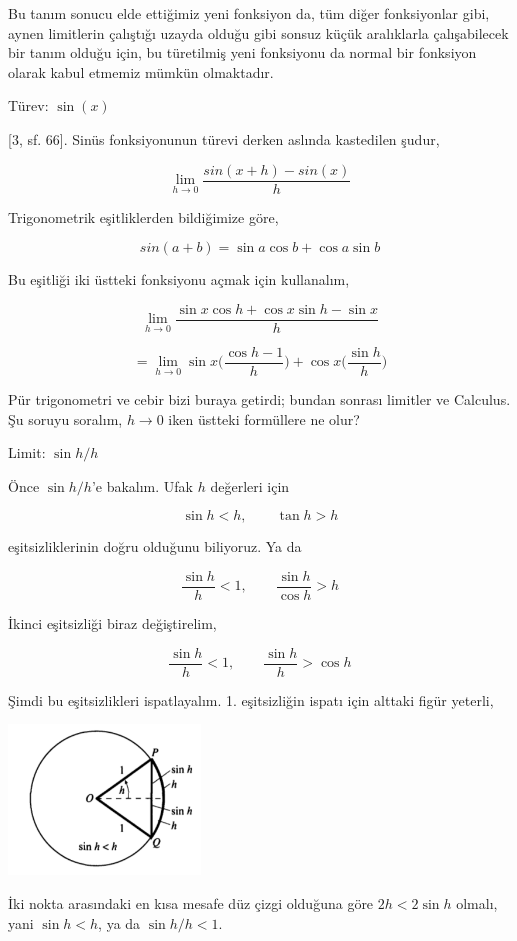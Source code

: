 \documentclass[12pt,fleqn]{article}\usepackage{../../common}
\begin{document}
Bu tanım sonucu elde ettiğimiz yeni fonksiyon da, tüm diğer fonksiyonlar
gibi, aynen limitlerin çalıştığı uzayda olduğu gibi sonsuz küçük
aralıklarla çalışabilecek bir tanım olduğu için, bu türetilmiş yeni
fonksiyonu da normal bir fonksiyon olarak kabul etmemiz mümkün olmaktadır.

Türev: $\sin(x)$

[3, sf. 66]. Sinüs fonksiyonunun türevi derken aslında kastedilen şudur,

$$ \lim_{h \to 0} \frac{sin(x+h) - sin(x)}{h} $$

Trigonometrik eşitliklerden bildiğimize göre, 

$$ sin(a+b) = \sin a \cos b + \cos a \sin b $$

Bu eşitliği iki üstteki fonksiyonu açmak için kullanalım,

$$ \lim_{h \to 0} \frac{\sin x \cos h + \cos x \sin h - \sin x }{h} $$

$$ = \lim_{h \to 0} \sin x \bigg( \frac{\cos h - 1}{h} \bigg) + \cos x \bigg( \frac{\sin h}{h} \bigg) $$

Pür trigonometri ve cebir bizi buraya getirdi; bundan sonrası limitler ve
Calculus. Şu soruyu soralım, $h \to 0$ iken üstteki formüllere ne olur? 

Limit: $\sin h / h$

Önce $\sin h / h$'e bakalım. Ufak $h$ değerleri için 

$$ \sin h < h, \qquad \tan h > h $$

eşitsizliklerinin doğru olduğunu biliyoruz. Ya da

$$ \frac{\sin h}{h} < 1, \qquad  \frac{\sin h}{\cos h} > h $$

İkinci eşitsizliği biraz değiştirelim,

$$ \frac{\sin h}{h} < 1, \qquad  \frac{\sin h}{h} > \cos h $$

Şimdi bu eşitsizlikleri ispatlayalım. 1. eşitsizliğin ispatı için alttaki
figür yeterli,

\includegraphics[height=4cm]{ode_mattuck_93_diff_01.png}

İki nokta arasındaki en kısa mesafe düz çizgi olduğuna göre $2h < 2\sin h$
olmalı, yani $\sin h < h$, ya da $\sin h / h < 1$.
\end{document}
